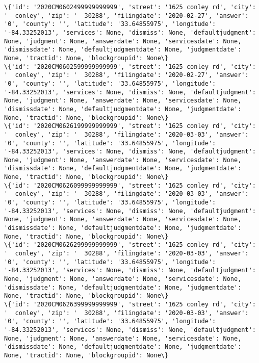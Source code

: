 \documentclass[11pt]{article}
\begin{document}
\begin{Verbatim}[commandchars=\\\{\}]
\{'id': '2020CM0602499999999999', 'street': '1625 conley rd', 'city': '  conley', 'zip': '  30288', 'filingdate': '2020-02-27', 'answer': '0', 'county': '', 'latitude': '33.64855975', 'longitude': '-84.33252013', 'services': None, 'dismiss': None, 'defaultjudgment': None, 'judgment': None, 'answerdate': None, 'servicesdate': None, 'dismissdate': None, 'defaultjudgmentdate': None, 'judgmentdate': None, 'tractid': None, 'blockgroupid': None\}
\{'id': '2020CM0602599999999999', 'street': '1625 conley rd', 'city': '  conley', 'zip': '  30288', 'filingdate': '2020-02-27', 'answer': '0', 'county': '', 'latitude': '33.64855975', 'longitude': '-84.33252013', 'services': None, 'dismiss': None, 'defaultjudgment': None, 'judgment': None, 'answerdate': None, 'servicesdate': None, 'dismissdate': None, 'defaultjudgmentdate': None, 'judgmentdate': None, 'tractid': None, 'blockgroupid': None\}
\{'id': '2020CM0626199999999999', 'street': '1625 conley rd', 'city': '  conley', 'zip': '  30288', 'filingdate': '2020-03-03', 'answer': '0', 'county': '', 'latitude': '33.64855975', 'longitude': '-84.33252013', 'services': None, 'dismiss': None, 'defaultjudgment': None, 'judgment': None, 'answerdate': None, 'servicesdate': None, 'dismissdate': None, 'defaultjudgmentdate': None, 'judgmentdate': None, 'tractid': None, 'blockgroupid': None\}
\{'id': '2020CM0626099999999999', 'street': '1625 conley rd', 'city': '  conley', 'zip': '  30288', 'filingdate': '2020-03-03', 'answer': '0', 'county': '', 'latitude': '33.64855975', 'longitude': '-84.33252013', 'services': None, 'dismiss': None, 'defaultjudgment': None, 'judgment': None, 'answerdate': None, 'servicesdate': None, 'dismissdate': None, 'defaultjudgmentdate': None, 'judgmentdate': None, 'tractid': None, 'blockgroupid': None\}
\{'id': '2020CM0626299999999999', 'street': '1625 conley rd', 'city': '  conley', 'zip': '  30288', 'filingdate': '2020-03-03', 'answer': '0', 'county': '', 'latitude': '33.64855975', 'longitude': '-84.33252013', 'services': None, 'dismiss': None, 'defaultjudgment': None, 'judgment': None, 'answerdate': None, 'servicesdate': None, 'dismissdate': None, 'defaultjudgmentdate': None, 'judgmentdate': None, 'tractid': None, 'blockgroupid': None\}
\{'id': '2020CM0626399999999999', 'street': '1625 conley rd', 'city': '  conley', 'zip': '  30288', 'filingdate': '2020-03-03', 'answer': '0', 'county': '', 'latitude': '33.64855975', 'longitude': '-84.33252013', 'services': None, 'dismiss': None, 'defaultjudgment': None, 'judgment': None, 'answerdate': None, 'servicesdate': None, 'dismissdate': None, 'defaultjudgmentdate': None, 'judgmentdate': None, 'tractid': None, 'blockgroupid': None\}

\end{Verbatim}
\end{document}
